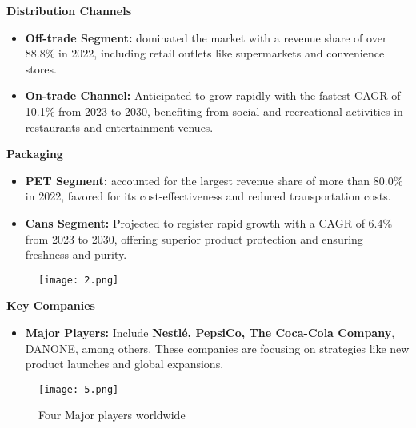 \documentclass{article}
\begin{document}
\textbf{
Distribution Channels}\par
\begin{itemize}
    \item \textbf{Off-trade Segment:} dominated the market with a revenue share of over 88.8\% in 2022, including retail outlets like supermarkets and convenience stores.
    \item \textbf{On-trade Channel:} Anticipated to grow rapidly with the fastest CAGR of 10.1\% from 2023 to 2030, benefiting from social and recreational activities in restaurants and entertainment venues.
\end{itemize}
\textbf{Packaging}\par
\begin{itemize}
    \item \textbf{PET Segment:} accounted for the largest revenue share of more than 80.0\% in 2022, favored for its cost-effectiveness and reduced transportation costs.
    \item \textbf{Cans Segment:} Projected to register rapid growth with a CAGR of 6.4\% from 2023 to 2030, offering superior product protection and ensuring freshness and purity.
\end{itemize}
\begin{figure}[H]
\centering
\texttt{[image: 2.png]}
\label{fig:unique_label_2}
\end{figure}
\textbf{Key Companies}
\begin{itemize}
    \item \textbf{Major Players:} Include \textbf{Nestlé, PepsiCo, The Coca-Cola Company}, DANONE, among others. These companies are focusing on strategies like new product launches and global expansions.
\end{itemize}
\begin{figure}[H]
\centering
\texttt{[image: 5.png]}
\label{fig:unique_label_5}
\caption{Four Major players worldwide}
\end{figure}
\end{document}

